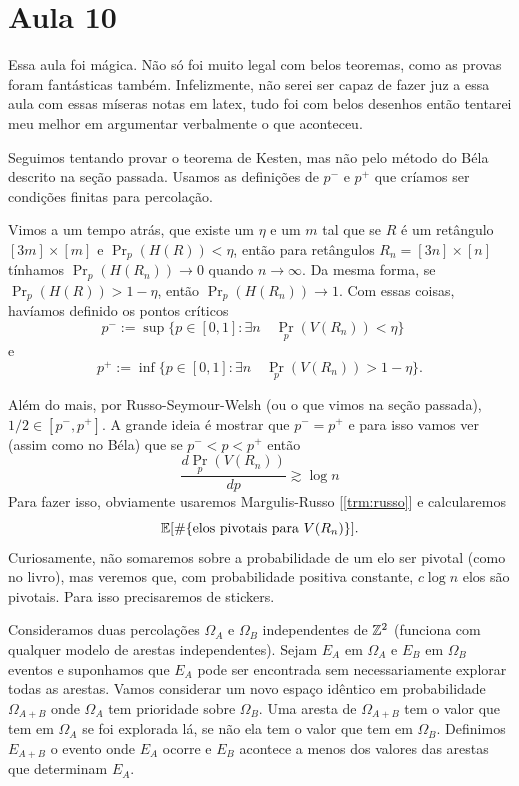 \section{Aula 10}

Essa aula foi mágica. Não só foi muito legal com belos teoremas,
como as provas foram fantásticas também. Infelizmente, não serei ser
capaz de fazer juz a essa aula com essas míseras notas em latex,
tudo foi com belos desenhos então tentarei meu melhor em argumentar
verbalmente o que aconteceu.

Seguimos tentando provar o teorema de Kesten, mas não pelo método
do Béla descrito na seção passada. Usamos as definições de $p^-$ e $p^+$
que críamos ser condições finitas para percolação.

Vimos a um tempo atrás, que existe um $\eta$ e um $m$ tal que se $R$ é um
retângulo $[3m]\times[m]$ e $\Pr_p(H(R)) < \eta$, então para retângulos
$R_n = [3n]\times[n]$ tínhamos $\Pr_p(H(R_n)) \to 0$ quando
$n \to \infty$. Da mesma forma, se $\Pr_p(H(R)) > 1 - \eta$,
então $\Pr_p(H(R_n)) \to 1$. Com essas coisas, havíamos definido
os pontos críticos
\[
	p^{-} := \sup\{p \in [0,1] : \exists n \quad \Pr_p(V(R_n)) < \eta\} \quad
\]
e
\[
	p^{+} := \inf\{ p \in [0,1] : \exists n\quad  \Pr_p(V(R_n)) > 1 - \eta\}.
\]

Além do mais, por Russo-Seymour-Welsh (ou o que vimos na seção passada),
$1/2 \in [p^{-}, p^{+}]$. A grande ideia é mostrar que $p^{-} =
p^{+}$ e para isso
vamos ver (assim como no Béla) que se $p^{-} < p < p^{+}$ então
\[
	\frac{d\Pr_p(V(R_n))}{dp} \gtrsim \log n
\]
Para fazer isso, obviamente usaremos Margulis-Russo [\ref{trm:russo}]
e calcularemos
\[\mathbb{E}[\# \{\text{elos pivotais para }V(R_n)\}].
\]
Curiosamente, não somaremos sobre a probabilidade de um elo ser
pivotal (como no livro),
mas veremos que, com probabilidade positiva constante, $c\log n$ elos
são pivotais. Para isso
precisaremos de stickers.

Consideramos duas percolações $\Omega_A$ e $\Omega_B$ independentes
de $\mathbb{Z}^2$ (funciona com qualquer modelo de
arestas independentes). Sejam $E_A$
em $\Omega_A$ e $E_B$ em $\Omega_B$ eventos e suponhamos que $E_A$ pode
ser encontrada sem necessariamente explorar todas as arestas. Vamos
considerar um novo espaço idêntico em probabilidade $\Omega_{A + B}$
onde $\Omega_A$ tem prioridade sobre $\Omega_B$. Uma aresta de $\Omega_{A+B}$
tem o valor que tem em $\Omega_A$ se foi explorada lá, se não ela
tem o valor que tem em $\Omega_B$. Definimos $E_{A+B}$ o evento onde
$E_A$ ocorre e $E_B$ acontece a menos dos valores das arestas que
determinam $E_A$.

